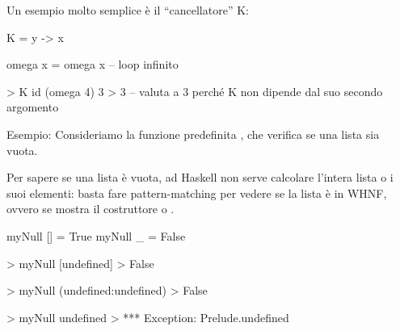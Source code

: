 Un esempio molto semplice è il ``cancellatore'' K:
\begin{haskellbox}{}
K = \x y -> x

omega x = omega x -- loop infinito

> K id (omega 4) 3
> 3 -- valuta a 3 perché K non dipende dal suo secondo argomento
\end{haskellbox}

\begin{gframe}{Esempio: }
    Consideriamo la funzione predefinita , che verifica se una lista sia vuota.

    Per sapere se una lista è vuota, ad Haskell non serve calcolare l'intera lista o i suoi elementi: basta fare pattern-matching per vedere se la lista è in WHNF, ovvero se mostra il costruttore \code{:} o \code{[]}.

    \begin{haskellbox}{}
myNull [] = True
myNull _ = False

> myNull [undefined]
> False

> myNull (undefined:undefined)
> False

> myNull undefined 
> *** Exception: Prelude.undefined
    \end{haskellbox}
\end{gframe}

